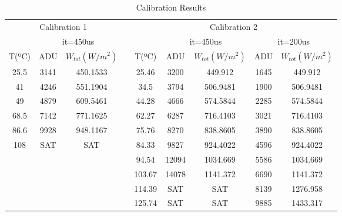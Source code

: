 \begin{table}[h]
\centering
\caption{Calibration Results}
\label{tab:calibration}
\begin{tabular}{ccccccccc}
\toprule
\multicolumn{3}{c}{Calibration 1}       &  & \multicolumn{5}{c}{Calibration 2}                                    \\ 
\cmidrule[0.4pt](r{0.125em}){1-3}%
\cmidrule[0.4pt](r{0.125em}){5-9}%
         & \multicolumn{2}{c}{it=450us} &  &        & \multicolumn{2}{c}{it=450us} & \multicolumn{2}{c}{it=200us} \\
\cmidrule[0.4pt](r{0.125em}){2-3}%
\cmidrule[0.4pt](r{0.125em}){6-7}%
\cmidrule[0.4pt](r{0.125em}){8-9}%
T(ºC)  & ADU         & $W_{tot}(W/m^2)$      &  & T(ºC)& ADU         & $W_{tot}(W/m^2)$      & ADU         & $W_{tot}(W/m^2)$      \\
\cmidrule[0.4pt](r{0.125em}){1-3}%
\cmidrule[0.4pt](r{0.125em}){5-9}%
25.5     & 3141        & 450.1533       &  & 25.46  & 3200        & 449.912        & 1645        & 449.912        \\
41       & 4246        & 551.1904       &  & 34.5   & 3794        & 506.9481       & 1900        & 506.9481       \\
49       & 4879        & 609.5461       &  & 44.28  & 4666        & 574.5844       & 2285        & 574.5844       \\
68.5     & 7142        & 771.1625       &  & 62.27  & 6287        & 716.4103       & 3021        & 716.4103       \\
86.6     & 9928        & 948.1167       &  & 75.76  & 8270        & 838.8605       & 3890        & 838.8605       \\
108      & SAT         & SAT            &  & 84.33  & 9827        & 924.4022       & 4596        & 924.4022       \\
         &             &                &  & 94.54  & 12094       & 1034.669       & 5586        & 1034.669       \\
         &             &                &  & 103.67 & 14078       & 1141.372       & 6690        & 1141.372       \\
         &             &                &  & 114.39 & SAT         & SAT            & 8139        & 1276.958       \\
         &             &                &  & 125.74 & SAT         & SAT            & 9885        & 1433.317     \\ \bottomrule
\end{tabular}
\end{table}

